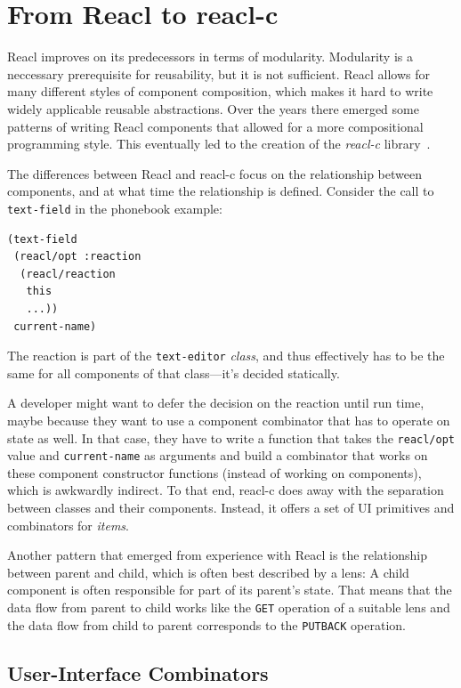 \documentclass[sigplan,review,screen]{acmart}
\begin{document}
\section{From Reacl to reacl-c}
\label{sec:reacl-c}

Reacl improves on its predecessors in terms of modularity. Modularity
is a neccessary prerequisite for reusability, but it is not
sufficient. Reacl allows for many different styles of component
composition, which makes it hard to write widely applicable reusable
abstractions. Over the years there emerged some patterns of writing
Reacl components that allowed for a more compositional programming
style. This eventually led to the creation of the \textit{reacl-c}
library~\cite{reacl-c}.

The differences between Reacl and reacl-c focus on the relationship
between components, and at what time the relationship is
defined.  Consider the call to \texttt{text-field} in the
phonebook example:
%
\begin{verbatim}
(text-field
 (reacl/opt :reaction
  (reacl/reaction
   this
   ...))
 current-name)
\end{verbatim}
%
The reaction is part of the \texttt{text-editor} \emph{class}, and
thus effectively has to be the same for all components of that
class---it's decided statically.

A developer might want to defer the decision on the reaction until run time,
maybe because they want to use a
component combinator that has to operate on state as well.
In that case, they have
to write a function that takes the \texttt{reacl/opt} value and
\texttt{current-name} as arguments and build a combinator
that works on these component constructor functions (instead of
working on components), which is awkwardly indirect.
To that end, reacl-c does away with the
separation between classes and their components.
Instead, it offers a set of UI primitives and combinators for
\textit{items}.  

Another pattern that emerged from experience with Reacl
is the relationship between parent
and child, which is often best described by a lens\cite{Lenses}:
A child component is often responsible for part of its parent's
state. That means that the data flow from parent to child works like
the \texttt{GET} operation of a suitable lens and the data flow from
child to parent corresponds to the \texttt{PUTBACK} operation.

\subsection{User-Interface Combinators}
\end{document}

